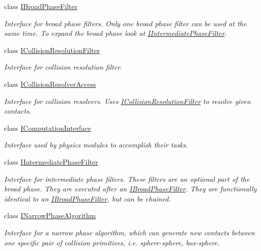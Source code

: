 \begin{DoxyCompactItemize}
class \mbox{\hyperlink{classr3_1_1_i_broad_phase_filter}{I\+Broad\+Phase\+Filter}}
\begin{DoxyCompactList}\small\item\em Interface for broad phase filters. Only one broad phase filter can be used at the same time. To expand the broad phase look at \mbox{\hyperlink{classr3_1_1_i_intermediate_phase_filter}{I\+Intermediate\+Phase\+Filter}}. \end{DoxyCompactList}\item 
class \mbox{\hyperlink{classr3_1_1_i_collision_resolution_filter}{I\+Collision\+Resolution\+Filter}}
\begin{DoxyCompactList}\small\item\em Interface for collision resolution filter. \end{DoxyCompactList}\item 
class \mbox{\hyperlink{classr3_1_1_i_collision_resolver_access}{I\+Collision\+Resolver\+Access}}
\begin{DoxyCompactList}\small\item\em Interface for collision resolvers. Uses \mbox{\hyperlink{classr3_1_1_i_collision_resolution_filter}{I\+Collision\+Resolution\+Filter}} to resolve given contacts. \end{DoxyCompactList}\item 
class \mbox{\hyperlink{classr3_1_1_i_computation_interface}{I\+Computation\+Interface}}
\begin{DoxyCompactList}\small\item\em Interface used by physics modules to accomplish their tasks. \end{DoxyCompactList}\item 
class \mbox{\hyperlink{classr3_1_1_i_intermediate_phase_filter}{I\+Intermediate\+Phase\+Filter}}
\begin{DoxyCompactList}\small\item\em Interface for intermediate phase filters. These filters are an optional part of the broad phase. They are executed after an \mbox{\hyperlink{classr3_1_1_i_broad_phase_filter}{I\+Broad\+Phase\+Filter}}. They are functionally identical to an \mbox{\hyperlink{classr3_1_1_i_broad_phase_filter}{I\+Broad\+Phase\+Filter}}, but can be chained. \end{DoxyCompactList}\item 
class \mbox{\hyperlink{classr3_1_1_i_narrow_phase_algorithm}{I\+Narrow\+Phase\+Algorithm}}
\begin{DoxyCompactList}\small\item\em Interface for a narrow phase algorithm, which can generate new contacts between one specific pair of collision primitives, i.\+e. sphere-\/sphere, box-\/sphere. \end{DoxyCompactList}\item 

\end{DoxyCompactItemize}
